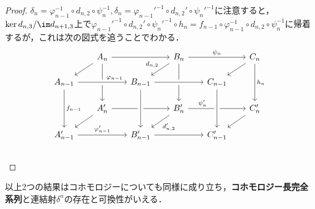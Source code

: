 \begin{proof}
	$\delta_n=\varphi_{n-1}^{-1}\circ d_{n,2}\circ\psi_n^{-1},\delta_n={\varphi_{n-1}'}^{-1}\circ{d_{n,2}}'\circ{\psi_n'}^{-1}$に注意すると，$\ker{d_{n,3}}/\im d_{n+1,3}$上で${\varphi_{n-1}'}^{-1}\circ{d_{n,2}'}\circ{\psi_n'}^{-1}\circ h_n=f_{n-1}\circ\varphi_{n-1}^{-1}\circ d_{n,2}\circ\psi_n^{-1}$に帰着するが，これは次の図式を追うことでわかる．
	\[\begin{tikzcd}[row sep=scriptsize, column sep=scriptsize]
		& A_n \arrow[dl] \arrow[rr] \arrow[dd] & & B_n \arrow[dl,"d_{n,2}",swap] \arrow[dd] \arrow[rr,"\psi_n"]&&C_n\arrow[dd,"h_n"]\arrow[ld]\\
		A_{n-1} \arrow[rr, crossing over,"\varphi_{n-1}",near end] \arrow[dd,"f_{n-1}"] & & B_{n-1} \arrow[rr,crossing over]&& C_{n-1}\\
		& A_n' \arrow[dl] \arrow[rr] & & B_n' \arrow[dl,"d_{n,2}'"] \arrow[rr,near start,"\psi_n'"]&&C_n'\arrow[ld]\\
		A_{n-1}' \arrow[rr,"\varphi_{n-1}'"] & & B_{n-1}' \arrow[from=uu, crossing over]\arrow[rr]&&C_{n-1}'\arrow[from=uu,crossing over]\\
		\end{tikzcd}\]
\end{proof}

以上2つの結果はコホモロジーについても同様に成り立ち，\textbf{コホモロジー長完全系列}と連結射$\delta^n$の存在と可換性がいえる．

